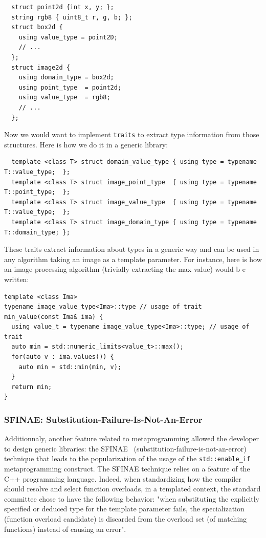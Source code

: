 \begin{verbatim}
  struct point2d {int x, y; };
  string rgb8 { uint8_t r, g, b; };
  struct box2d {
    using value_type = point2D;
    // ...
  };
  struct image2d {
    using domain_type = box2d;
    using point_type  = point2d;
    using value_type  = rgb8;
    // ...
  };
\end{verbatim}

Now we would want to implement \texttt{traits} to extract type information from those structures. Here is how we do it
in a generic library:

\begin{verbatim}
  template <class T> struct domain_value_type { using type = typename T::value_type;  };
  template <class T> struct image_point_type  { using type = typename T::point_type;  };
  template <class T> struct image_value_type  { using type = typename T::value_type;  };
  template <class T> struct image_domain_type { using type = typename T::domain_type; };
\end{verbatim}

These traits extract information about types in a generic way and can be used in any algorithm taking an image as a
template parameter. For instance, here is how an image processing algorithm (trivially extracting the max value) would b
e written:

\begin{verbatim}
template <class Ima>
typename image_value_type<Ima>::type // usage of trait
min_value(const Ima& ima) {
  using value_t = typename image_value_type<Ima>::type; // usage of trait
  auto min = std::numeric_limits<value_t>::max();
  for(auto v : ima.values()) {
    auto min = std::min(min, v);
  }
  return min;
}
\end{verbatim}

\subsubsection{SFINAE: Substitution-Failure-Is-Not-An-Error}
\label{subsec:sfinae}

Additionnaly, another feature related to metaprogramming  allowed the developer to design generic libraries: the
SFINAE~\parencite{vandevoorde.2002.c++} (substitution-failure-is-not-an-error) technique that leads to the
popularization of the usage of the \texttt{std::enable\_if} metaprogramming construct. The SFINAE technique relies on a
feature of the C++ programming language. Indeed, when standardizing how the compiler should resolve and select function
overloads, in a templated context, the standard committee chose to have the following behavior: "when substituting the
explicitly specified or deduced type for the template parameter fails, the specialization (function overload candidate)
is discarded from the overload set (of matching functions) instead of causing an error".

